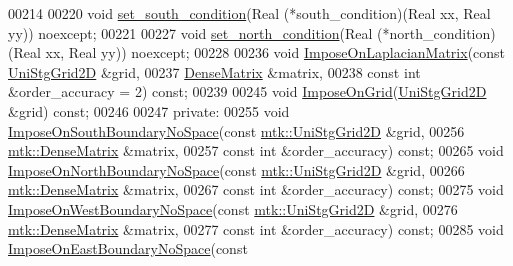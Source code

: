 \begin{DoxyCode}
00214 
00220   \textcolor{keywordtype}{void} \hyperlink{classmtk_1_1BCDescriptor2D_a408f159cc44d7ee610191efb8ed48b2a}{set\_south\_condition}(Real (*south\_condition)(Real xx, Real yy)) noexcept;
00221 
00227   \textcolor{keywordtype}{void} \hyperlink{classmtk_1_1BCDescriptor2D_a690f6881a88b202c074d9f90f2a7ddb0}{set\_north\_condition}(Real (*north\_condition)(Real xx, Real yy)) noexcept;
00228 
00236   \textcolor{keywordtype}{void} \hyperlink{classmtk_1_1BCDescriptor2D_a35592617dda3b965b680b2a1355122f4}{ImposeOnLaplacianMatrix}(\textcolor{keyword}{const} \hyperlink{classmtk_1_1UniStgGrid2D}{UniStgGrid2D} &grid,
00237                                \hyperlink{classmtk_1_1DenseMatrix}{DenseMatrix} &matrix,
00238                                \textcolor{keyword}{const} \textcolor{keywordtype}{int} &order\_accuracy = 2) \textcolor{keyword}{const};
00239 
00245   \textcolor{keywordtype}{void} \hyperlink{classmtk_1_1BCDescriptor2D_a5f0ff1fda1b5266dcd77ba2301c8ba2c}{ImposeOnGrid}(\hyperlink{classmtk_1_1UniStgGrid2D}{UniStgGrid2D} &grid) \textcolor{keyword}{const};
00246 
00247 \textcolor{keyword}{private}:
00255   \textcolor{keywordtype}{void} \hyperlink{classmtk_1_1BCDescriptor2D_a0188a64f242ae6015385a4597934fcda}{ImposeOnSouthBoundaryNoSpace}(\textcolor{keyword}{const} 
      \hyperlink{classmtk_1_1UniStgGrid2D}{mtk::UniStgGrid2D} &grid,
00256                                     \hyperlink{classmtk_1_1DenseMatrix}{mtk::DenseMatrix} &matrix,
00257                                     \textcolor{keyword}{const} \textcolor{keywordtype}{int} &order\_accuracy) \textcolor{keyword}{const};
00265   \textcolor{keywordtype}{void} \hyperlink{classmtk_1_1BCDescriptor2D_a5e7d4b9deba6c07170e983eb1c0e9776}{ImposeOnNorthBoundaryNoSpace}(\textcolor{keyword}{const} 
      \hyperlink{classmtk_1_1UniStgGrid2D}{mtk::UniStgGrid2D} &grid,
00266                                     \hyperlink{classmtk_1_1DenseMatrix}{mtk::DenseMatrix} &matrix,
00267                                     \textcolor{keyword}{const} \textcolor{keywordtype}{int} &order\_accuracy) \textcolor{keyword}{const};
00275   \textcolor{keywordtype}{void} \hyperlink{classmtk_1_1BCDescriptor2D_a0b153abdcb78c54197858148c9632517}{ImposeOnWestBoundaryNoSpace}(\textcolor{keyword}{const} 
      \hyperlink{classmtk_1_1UniStgGrid2D}{mtk::UniStgGrid2D} &grid,
00276                                    \hyperlink{classmtk_1_1DenseMatrix}{mtk::DenseMatrix} &matrix,
00277                                    \textcolor{keyword}{const} \textcolor{keywordtype}{int} &order\_accuracy) \textcolor{keyword}{const};
00285   \textcolor{keywordtype}{void} \hyperlink{classmtk_1_1BCDescriptor2D_a65f58f43f3fdc793cce7293780b70b80}{ImposeOnEastBoundaryNoSpace}(\textcolor{keyword}{const} 

\end{DoxyCode}
